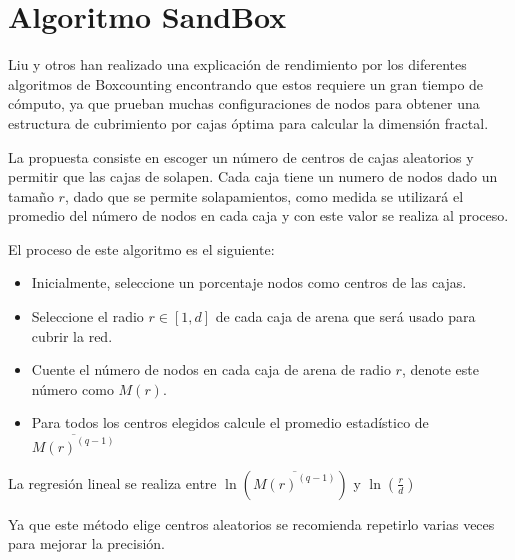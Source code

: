 \section{Algoritmo SandBox}

Liu y otros\cite{Liu2015} han realizado una explicación de rendimiento por los diferentes algoritmos de Boxcounting encontrando que estos requiere un gran tiempo de cómputo, ya que prueban muchas configuraciones de nodos para obtener una estructura de cubrimiento por cajas óptima para calcular la dimensión fractal.

La propuesta consiste en escoger un número de centros de cajas aleatorios y permitir que las cajas de solapen. Cada caja tiene un numero de nodos dado un tamaño $r$, dado que se permite solapamientos, como medida se utilizará el promedio del número de nodos en cada caja y con este valor se realiza al proceso.

El proceso de este algoritmo es el siguiente:

 \begin{itemize}
     \item Inicialmente, seleccione un porcentaje nodos como centros de las cajas.
     \item Seleccione el radio $r \in [1,d]$ de cada caja de arena que será usado para cubrir la red.
     \item Cuente el número de nodos en cada caja de arena de radio $r$, denote este número como $M(r)$.
     \item Para todos los centros elegidos calcule el promedio estadístico de $\overline{M(r)^(q-1)}$
 \end{itemize}
 
 La regresión lineal se realiza entre $\ln(\overline{M(r)^(q-1)})$ y $\ln(\frac{r}{d})$
 
 Ya que este método elige centros aleatorios se recomienda repetirlo varias veces para mejorar la precisión.
 

 